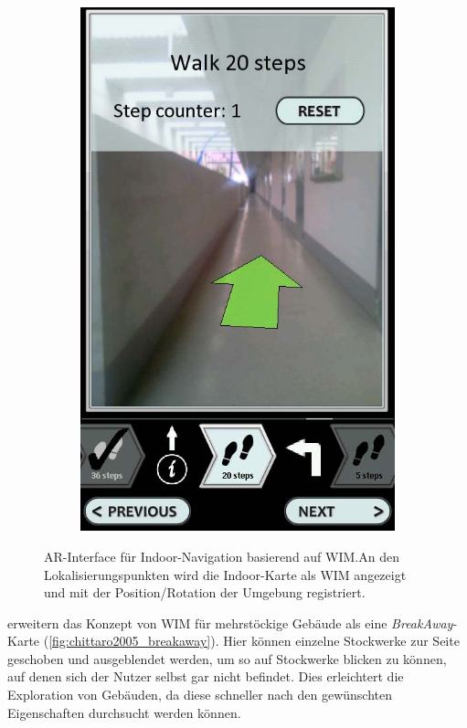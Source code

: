 \begin{figure}[t]
\begin{subfigure}{.195\textwidth}
		\includegraphics[width=\textwidth]{figures/mulloni2011_wim_e.png}
		\caption{}
		\label{sfig:mulloni2011_wim_e}
	\end{subfigure}
	\caption{AR-Interface für Indoor-Navigation basierend auf WIM.\@ An den Lokalisierungspunkten wird die Indoor-Karte als WIM angezeigt und mit der Position/Rotation der Umgebung registriert.}
	\label{fig:mulloni2011_wim}
\end{figure}

\textcite{Chittaro2005} erweitern das Konzept von WIM für mehrstöckige Gebäude als eine \emph{BreakAway}-Karte (\autoref{fig:chittaro2005_breakaway}).
Hier können einzelne Stockwerke zur Seite geschoben und ausgeblendet werden, um so auf Stockwerke blicken zu können, auf denen sich der Nutzer selbst gar nicht befindet.
Dies erleichtert die Exploration von Gebäuden, da diese schneller nach den gewünschten Eigenschaften durchsucht werden können.

